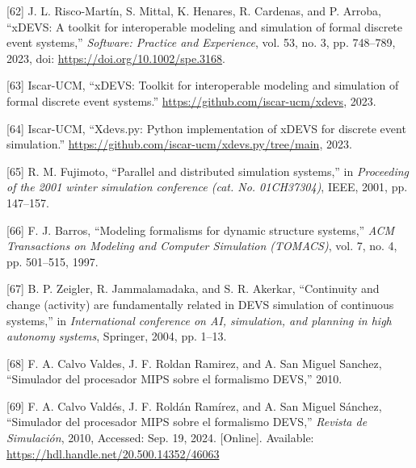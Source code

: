 \documentclass[12pt,oneside]{templates/unerthesis}
\newcommand{\CSLLeftMargin}[1]{#1} %
\newcommand{\CSLRightInline}[1]{#1} %
\newlength{\cslhangindent}
\newenvironment{CSLReferences}[2] %
 {\setlength{\parindent}{0pt}%
  \setlength{\leftskip}{#1 pt\relax}%
  \setlength{\parskip}{#2 pt\relax}%
  \everypar{\setlength{\hangindent}{\cslhangindent}}}
 {\par}
\begin{document}
\begin{CSLReferences}{0}{0}
\leavevmode{}%
\CSLLeftMargin{{[}62{]} }%
\CSLRightInline{J. L. Risco-Martín, S. Mittal, K. Henares, R. Cardenas, and P. Arroba, {``xDEVS: A toolkit for interoperable modeling and simulation of formal discrete event systems,''} \emph{Software: Practice and Experience}, vol. 53, no. 3, pp. 748--789, 2023, doi: \url{https://doi.org/10.1002/spe.3168}.}

\leavevmode{}%
\CSLLeftMargin{{[}63{]} }%
\CSLRightInline{Iscar-UCM, {``xDEVS: Toolkit for interoperable modeling and simulation of formal discrete event systems.''} \url{https://github.com/iscar-ucm/xdevs}, 2023.}

\leavevmode{}%
\CSLLeftMargin{{[}64{]} }%
\CSLRightInline{Iscar-UCM, {``Xdevs.py: Python implementation of xDEVS for discrete event simulation.''} \url{https://github.com/iscar-ucm/xdevs.py/tree/main}, 2023.}

\leavevmode{}%
\CSLLeftMargin{{[}65{]} }%
\CSLRightInline{R. M. Fujimoto, {``Parallel and distributed simulation systems,''} in \emph{Proceeding of the 2001 winter simulation conference (cat. No. 01CH37304)}, IEEE, 2001, pp. 147--157.}

\leavevmode{}%
\CSLLeftMargin{{[}66{]} }%
\CSLRightInline{F. J. Barros, {``Modeling formalisms for dynamic structure systems,''} \emph{ACM Transactions on Modeling and Computer Simulation (TOMACS)}, vol. 7, no. 4, pp. 501--515, 1997.}

\leavevmode{}%
\CSLLeftMargin{{[}67{]} }%
\CSLRightInline{B. P. Zeigler, R. Jammalamadaka, and S. R. Akerkar, {``Continuity and change (activity) are fundamentally related in DEVS simulation of continuous systems,''} in \emph{International conference on AI, simulation, and planning in high autonomy systems}, Springer, 2004, pp. 1--13.}

\leavevmode{}%
\CSLLeftMargin{{[}68{]} }%
\CSLRightInline{F. A. Calvo Valdes, J. F. Roldan Ramirez, and A. San Miguel Sanchez, {``Simulador del procesador MIPS sobre el formalismo DEVS,''} 2010.}

\leavevmode{}%
\CSLLeftMargin{{[}69{]} }%
\CSLRightInline{F. A. Calvo Valdés, J. F. Roldán Ramírez, and A. San Miguel Sánchez, {``Simulador del procesador {MIPS} sobre el formalismo {DEVS},''} \emph{Revista de Simulación}, 2010, Accessed: Sep. 19, 2024. {[}Online{]}. Available: \url{https://hdl.handle.net/20.500.14352/46063}}


\end{CSLReferences}
\end{document}
